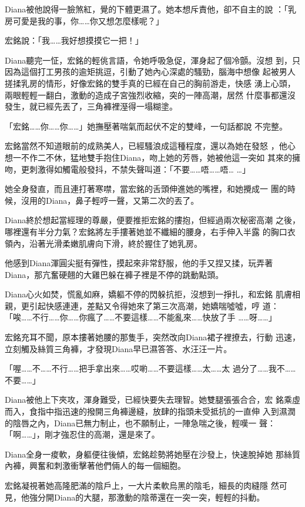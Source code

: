 Diana被他說得一臉煞紅，覺的下體更濕了。她本想斥責他，卻不自主的說
：「乳房可愛是我的事，你……你又想怎麼樣呢？」

宏銘說：「我……我好想摸摸它一把！」

Diana聽完一怔，宏銘的輕佻言語，令她呼吸急促，渾身起了個冷顫。沒想
到，只因為這個打工男孩的逾矩挑逗，引動了她內心深處的騷勁，腦海中想像
起被男人搓揉乳房的情形，好像宏銘的雙手真的已經在自己的胸前游走，快感
湧上心頭，兩眼輕輕一翻白，激動的造成子宮強烈收縮，突的一陣高潮，居然
什麼事都還沒發生，就已經先丟了，三角褲裡溼得一塌糊塗。

「宏銘……你……你……」她撫壓著喘氣而起伏不定的雙峰，一句話都說
不完整。

宏銘當然不知道眼前的成熟美人，已經騷浪成這種程度，還以為她在發怒
，他心想一不作二不休，猛地雙手抱住Diana，吻上她的芳唇，她被他這一突如
其來的擁吻，更刺激得如觸電般發抖，不禁失聲叫道：「不要……唔……唔…
…」

她全身發直，而且連打著寒噤，當宏銘的舌頭伸進她的嘴裡，和她攪成一
團的時候，沒用的Diana，鼻子輕哼一聲，又第二次的丟了。

Diana終於想起當經理的尊嚴，便要推拒宏銘的摟抱，但經過兩次秘密高潮
之後，哪裡還有半分力氣？宏銘將左手摟著她並不纖細的腰身，右手伸入半露
的胸口衣領內，沿著光滑柔嫩肌膚向下滑，終於握住了她乳房。

他感到Diana渾圓尖挺有彈性，摸起來非常舒服，他的手又捏又揉，玩弄著
Diana，那亢奮硬翹的大雞巴躲在褲子裡是不停的跳動點頭。

Diana心火如焚，慌亂如麻，嬌軀不停的閃躲抗拒，沒想到一掙扎，和宏銘
肌膚相親，更引起快感連連，差點又令得她來了第三次高潮，她嬌喘噓噓，哼
道：「唉……不行……你……你瘋了……不要這樣……不能亂來……快放了手
……呀……」

宏銘充耳不聞，原本摟著她腰的那隻手，突然改向Diana裙子裡撩去，行動
迅速，立刻觸及絲質三角褲，才發現Diana早已濕答答、水汪汪一片。

「喔……不……不行……把手拿出來……哎喲……不要這樣……太……太
過分了……我不……不要……」

Diana被他上下夾攻，渾身難受，已經快要失去理智。她雙腿張張合合，宏
銘乘虛而入，食指中指迅速的撥開三角褲邊縫，放肆的指頭未受抵抗的一直伸
入到濕潤的陰唇之內，Diana已無力制止，也不願制止，一陣急喘之後，輕嘆一
聲：「啊……」，剛才強忍住的高潮，還是來了。

Diana全身一痠軟，身軀便往後傾，宏銘趁勢將她壓在沙發上，快速脫掉她
那絲質內褲，興奮和刺激衝擊著他們倆人的每一個細胞。

宏銘凝視著她高隆肥滿的陰戶上，一大片柔軟烏黑的陰毛，細長的肉縫隱
然可見，他強分開Diana的大腿，那激動的陰蒂還在一突一突，輕輕的抖動。

